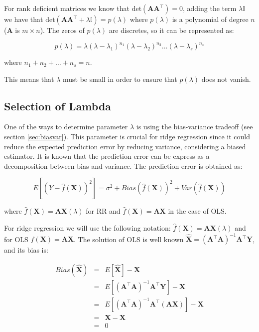 For rank deficient matrices we know that $\text{det}(\mathbf{A A^\top})=0$, adding the
term $\lambda \mathbb{I}$ we have that $\text{det}(\mathbf{A A^\top}+\lambda \mathbb{I}) =
p(\lambda)$ where $p(\lambda)$ is a polynomial of degree $n$ ($\mathbf{A}$ is
$m \times n$). The zeros of $p(\lambda)$ are discretes, so it can be represented
as:

\[
p(\lambda) =
\lambda(\lambda-\lambda_1)^{n_1}(\lambda-\lambda_2)^{n_2}\dots(\lambda-\lambda_s)^{n_s}
\]

\noindent where $n_1 + n_2 + \dots + n_s = n$.

This means that $\lambda$ must be small in order to ensure that $p(\lambda)$
does not vanish.


\subsection{Selection of Lambda}

One of the ways to determine parameter $\lambda$ is using the bias-variance tradeoff (see section \ref{sec:biasvar}). This parameter is crucial for ridge regression since it could
reduce the expected prediction error by reducing variance, considering a biased
estimator. 
It is known that the prediction error can be express as a decomposition between bias and variance. The prediction error is
obtained as:

\begin{equation}
 \label{eq:prederror}
E[(Y-\hat{f}(\mathbf{X}))^2] = \sigma^2 + Bias(\hat{f}(\mathbf{X}))^2 + Var(\hat{f}(\mathbf{X}))
\end{equation}

\noindent where $\hat{f}(\mathbf{X})=\mathbf{AX}(\lambda)$ for RR and
$\hat{f}(\mathbf{X})=\mathbf{AX}$ in the case of OLS.

For ridge regression we will use the following notation: $\hat{f}(\mathbf{X})=\mathbf{AX}(\lambda)$ and
for OLS $f(\mathbf{X})=\mathbf{AX}$. The solution of OLS is well known $\hat{\mathbf{X}}=(\mathbf{A}^\top \mathbf{A})^{-1}\mathbf{A}^\top \mathbf{Y}$, and its bias is:

\begin{eqnarray*}
Bias(\hat{\mathbf{X}}) &=& E[\hat{\mathbf{X}}] - \mathbf{X} \\
&=& E[ (\mathbf{A}^\top \mathbf{A})^{-1}\mathbf{A}^\top \mathbf{Y}] - \mathbf{X} \\
&=& E[ (\mathbf{A}^\top \mathbf{A})^{-1}\mathbf{A}^\top (\mathbf{AX})] - \mathbf{X}  \\
&=& \mathbf{X}  - \mathbf{X}  \\
&=&  0
\end{eqnarray*}


